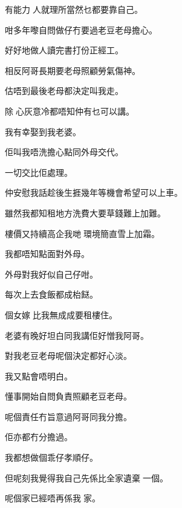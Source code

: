 有能力󱝚人就理所當然乜都要靠自己。

咁多年嚟自問做仔冇要過老豆老母擔心。

好好地做人讀完書打份正經工。

相反阿哥長期要老母照顧勞氣傷神。

估唔到最後老母都決定叫我走。

除󱃡心灰意冷都唔知仲有乜可以講。

我有幸娶到我老婆。

佢叫我唔洗擔心點同外母交代。

一切交比佢處理。

仲安慰我話趁後生捱幾年等機會希望可以上車。

雖然我都知租地方洗費大要草錢難上加難。

樓價又持續高企我哋󱝚環境簡直雪上加霜。

我都唔知點面對外母。

外母對我好似自己仔咁。      

每次上去食飯都成枱餸。

個女嫁󱃡比我無成成要租樓住。

老婆有晚好坦白同我講佢好憎我阿哥。

對我老豆老母呢個決定都好心淡。

我又點會唔明白。

懂事開始自問負責照顧老豆老母。

呢個責任冇旨意過阿哥同我分擔。

佢亦都冇分擔過。

我都想做個乖仔孝順仔。

但呢刻我覺得我自己先係比全家遺棄󱝚一個。

呢個家已經唔再係我󱝚家。

